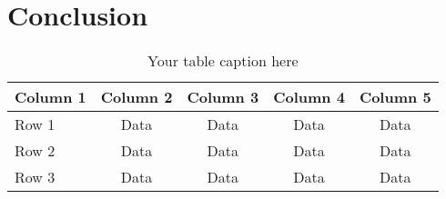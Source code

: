 \section{Conclusion}


\begin{table*}
    \centering
    \begin{tabular*}{\textwidth}{@{\extracolsep{\fill}}lcccc@{}}
    \toprule
    Column 1 & Column 2 & Column 3 & Column 4 & Column 5 \\
    \midrule
    Row 1 & Data & Data & Data & Data \\
    Row 2 & Data & Data & Data & Data \\
    Row 3 & Data & Data & Data & Data \\
    \bottomrule
    \end{tabular*}
    \caption{Your table caption here}
    \label{tab:your_label_here}
    \end{table*}

